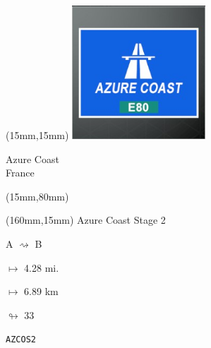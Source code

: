 \begin{textblock*}{50mm}(15mm,15mm)%
\includegraphics[width=50mm]{LG/2015-05-20_00073.png}
\par Azure Coast\\ France
\end{textblock*}
\begin{textblock*}{185mm}(15mm,80mm)%
\end{textblock*}
\begin{textblock*}{40mm}(160mm,15mm)%
Azure Coast Stage 2
\par A $\rightsquigarrow$ B
\Large
\par$\mapsto$ 4.28 mi.
\par$\mapsto$ 6.89 km
\par$\looparrowright$ 33
\par\hfill\tiny\tt AZCOS2\\
\end{textblock*}
\null\newpage

